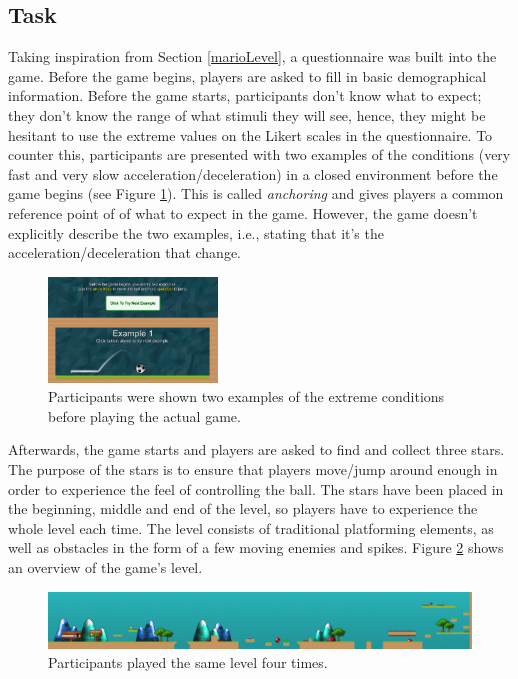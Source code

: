 \subsection{Task} \label{task}
Taking inspiration from Section \ref{marioLevel}, a questionnaire was built into the game. Before the game begins, players are asked to fill in basic demographical information. Before the game starts, participants don't know what to expect; they don't know the range of what stimuli they will see, hence, they might be hesitant to use the extreme values on the Likert scales in the questionnaire. To counter this, participants are presented with two examples of the conditions (very fast and very slow acceleration/deceleration) in a closed environment before the game begins (see Figure \ref{fig:example}). This is called \textit{anchoring} \cite{cunningham} and gives players a common reference point of of what to expect in the game. However, the game doesn't explicitly describe the two examples, i.e., stating that it's the acceleration/deceleration that change.

\begin{figure}[htbp]
\centering
\includegraphics[width=0.4\textwidth]{Pics/example}
\caption{Participants were shown two examples of the extreme conditions before playing the actual game.}
\label{fig:example}
\end{figure}

Afterwards, the game starts and players are asked to find and collect three stars. The purpose of the stars is to ensure that players move/jump around enough in order to experience the feel of controlling the ball. The stars have been placed in the beginning, middle and end of the level, so players have to experience the whole level each time. The level consists of traditional platforming elements, as well as obstacles in the form of a few moving enemies and spikes. Figure \ref{fig:level} shows an overview of the game's level.

\begin{figure}[htbp]
\centering
\includegraphics[width=1\textwidth]{Pics/levelStructure}
\caption{Participants played the same level four times.}
\label{fig:level}
\end{figure}

